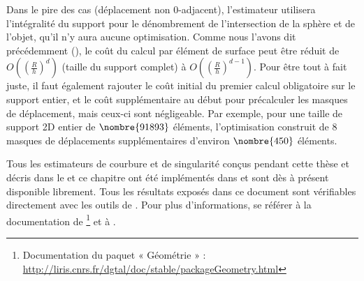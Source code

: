 Dans le pire des cas (déplacement non $0$-adjacent), l'estimateur utilisera
l'intégralité du support pour le dénombrement de l'intersection de la sphère et
de l'objet, \cad qu'il n'y aura aucune optimisation. Comme nous l'avons dit
précédemment (), le coût du calcul par élément de
surface peut être réduit de $O\left(\left(\frac{R}{h}\right)^d\right)$ (taille du support complet) à
$O\left(\left(\frac{R}{h}\right)^{d-1}\right)$. Pour être tout à fait juste, il faut également
rajouter le coût initial du premier calcul obligatoire sur le support entier, et
le coût supplémentaire au début pour précalculer les masques de déplacement,
mais ceux-ci sont négligeable. Par exemple, pour une taille de support 2D entier
de $\nombre{91893}$ éléments, l'optimisation construit de $8$ masques de
déplacements supplémentaires d'environ $\nombre{450}$ éléments.


Tous les estimateurs de courbure et de singularité conçus pendant cette thèse et
décris dans le  et ce chapitre ont été implémentés
dans \DGtal et sont dès à présent disponible librement. Tous les résultats
exposés dans ce document sont vérifiables directement avec les outils de \DGtal. Pour plus d'informations, se référer à la documentation de \DGtal\footnote{Documentation du paquet « Géométrie » :
\url{http://liris.cnrs.fr/dgtal/doc/stable/packageGeometry.html}} et à \cite{Coeurjolly2013Implementation}.
